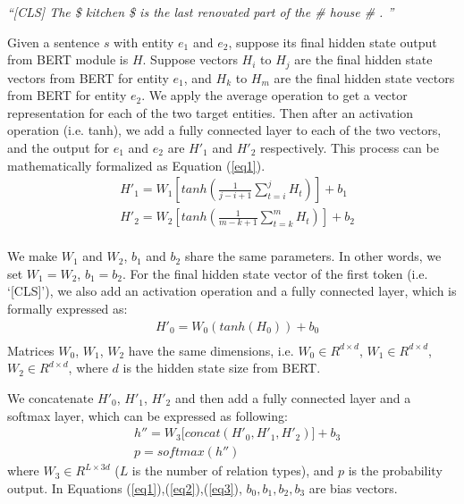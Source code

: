 \documentclass[11pt]{article}
\begin{document}
 \textit{``[CLS] The \$ kitchen \$ is the last renovated part of the \# house \# . ''}

Given a sentence $s$ with  entity $e_1$ and $e_2$, suppose its final hidden state output from BERT module is $H$. 
Suppose vectors $H_i$ to $H_j$  are the final hidden state vectors from BERT for
entity $e_1$, and  $H_k$ to $H_m$  are the final hidden state vectors from BERT for
entity $e_2$. We apply the average operation to get a vector representation
for each of the two target entities. Then after an activation operation (i.e. tanh), 
we add a fully connected layer to each of the two vectors, and the output
for $e_1$ and $e_2$ are $H'_1$ and $H'_2$ respectively. This process can be mathematically formalized as Equation (\ref{eq1}).
\begin{equation} \label{eq1}
\begin{split}
&H'_1 =W_1 \left[    tanh \left( \frac{1}{j-i+1} \sum_{t=i}^{j} H_t  \right)      \right] + b_1 \\
&H'_2 =W_2 \left[    tanh \left( \frac{1}{m-k+1} \sum_{t=k}^{m} H_t  \right)      \right]  + b_2\\
\end{split}
\end{equation}


We make $W_1$ and $W_2$, $b_1$ and $b_2$ share the same parameters. In other words,
we set $W_1=W_2$, $b_1=b_2$.
For the final hidden state vector of the first token (i.e. `[CLS]'), we also add an activation operation and a
fully connected layer, which is formally expressed
as:
\begin{equation} \label{eq2}
\begin{split}
&H'_0 = W_0 \left( tanh (H_0)  \right)  + b_0\\
\end{split}
\end{equation}
Matrices $W_0$, $W_1$, $W_2$ have the same dimensions, i.e. 
 $W_0 \in R^{d\times d}$, $W_1 \in R^{d\times d}$, $W_2 \in R^{d\times d}$,
 where $d$ is the hidden state size from BERT.

We concatenate $H'_0$, $H'_1$, $H'_2$ and then add a fully connected layer
and a softmax layer, which can be expressed as following:
\begin{equation} \label{eq3}
\begin{split}
&h''=W_3 \bigg [ concat \left(  H'_0, H'_1, H'_2 \right)  \bigg]  + b_3\\
&p = softmax(h'')
\end{split}
\end{equation}
where $W_3 \in R^{L\times 3d}$ ($L$ is the number of relation types),
and $p$ is the probability output.  In Equations (\ref{eq1}),(\ref{eq2}),(\ref{eq3}),
$b_0, b_1, b_2, b_3$ are bias vectors.
\end{document}
